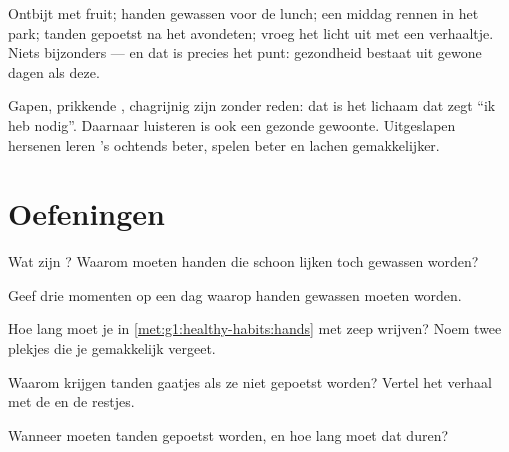 \begin{example}\label{ex:g1:healthy-habits:day}
Ontbijt met fruit; handen gewassen voor de lunch; een middag rennen in
het park; tanden gepoetst na het avondeten; vroeg het licht uit met een
verhaaltje. Niets bijzonders --- en dat is precies het punt: gezondheid
bestaat uit gewone dagen als deze.
\end{example}

\begin{remark}\label{rem:g1:healthy-habits:tired}
Gapen, prikkende , chagrijnig zijn zonder reden: dat is het lichaam
dat zegt ``ik heb  nodig''. Daarnaar luisteren is ook een gezonde
gewoonte. Uitgeslapen hersenen leren 's ochtends beter, spelen beter en
lachen gemakkelijker.
\end{remark}

\section{Oefeningen}

\begin{exercise}[$\star$]\label{exo:g1:healthy-habits:1}
Wat zijn ? Waarom moeten handen die schoon lijken toch gewassen worden?
\end{exercise}

\begin{exercise}[$\star$]\label{exo:g1:healthy-habits:2}
Geef drie momenten op een dag waarop handen gewassen moeten worden.
\end{exercise}

\begin{exercise}[$\star$]\label{exo:g1:healthy-habits:3}
Hoe lang moet je in \cref{met:g1:healthy-habits:hands} met zeep
wrijven? Noem twee plekjes die je gemakkelijk vergeet.
\end{exercise}

\begin{exercise}[$\star$]\label{exo:g1:healthy-habits:4}
Waarom krijgen tanden gaatjes als ze niet gepoetst worden? Vertel het
verhaal met de  en de restjes.
\end{exercise}

\begin{exercise}[$\star$]\label{exo:g1:healthy-habits:5}
Wanneer moeten tanden gepoetst worden, en hoe lang moet dat duren?
\end{exercise}

